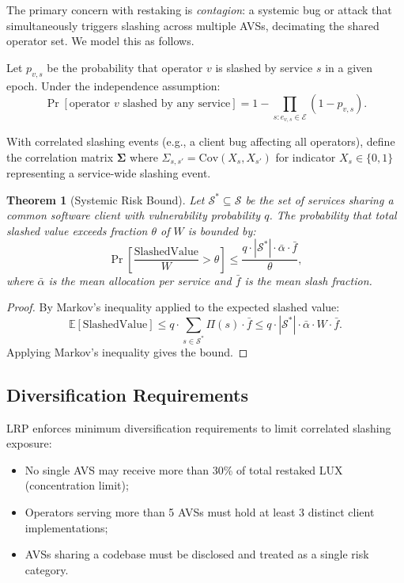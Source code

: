 \documentclass[11pt]{article}
\newtheorem{theorem}{Theorem}
\begin{document}
The primary concern with restaking is \emph{contagion}: a systemic bug or attack that
simultaneously triggers slashing across multiple AVSs, decimating the shared operator set.
We model this as follows.

Let $p_{v,s}$ be the probability that operator $v$ is slashed by service $s$ in a given
epoch. Under the independence assumption:
\[
  \Pr[\text{operator } v \text{ slashed by any service}] = 1 - \prod_{s: e_{v,s} \in \mathcal{E}} (1 - p_{v,s}).
\]

With correlated slashing events (e.g., a client bug affecting all operators), define the
correlation matrix $\boldsymbol{\Sigma}$ where $\Sigma_{s,s'} = \text{Cov}(X_s, X_{s'})$
for indicator $X_s \in \{0,1\}$ representing a service-wide slashing event.

\begin{theorem}[Systemic Risk Bound]
\label{thm:systemic}
Let $\mathcal{S}^* \subseteq \mathcal{S}$ be the set of services sharing a common software
client with vulnerability probability $q$. The probability that total slashed value exceeds
fraction $\theta$ of $W$ is bounded by:
\[
  \Pr\left[\frac{\text{SlashedValue}}{W} > \theta\right] \leq \frac{q \cdot |\mathcal{S}^*| \cdot \bar{\alpha} \cdot \bar{f}}{\theta},
\]
where $\bar{\alpha}$ is the mean allocation per service and $\bar{f}$ is the mean slash
fraction.
\end{theorem}

\begin{proof}
By Markov's inequality applied to the expected slashed value:
\[
  \mathbb{E}[\text{SlashedValue}] \leq q \cdot \sum_{s \in \mathcal{S}^*} \Pi(s) \cdot \bar{f}
  \leq q \cdot |\mathcal{S}^*| \cdot \bar{\alpha} \cdot W \cdot \bar{f}.
\]
Applying Markov's inequality gives the bound.
\end{proof}

\subsection{Diversification Requirements}

LRP enforces minimum diversification requirements to limit correlated slashing exposure:

\begin{itemize}[leftmargin=1.5em]
  \item No single AVS may receive more than 30\% of total restaked LUX (concentration limit);
  \item Operators serving more than 5 AVSs must hold at least 3 distinct client implementations;
  \item AVSs sharing a codebase must be disclosed and treated as a single risk category.
\end{itemize}
\end{document}
